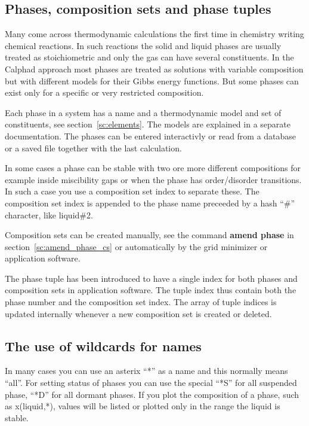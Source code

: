 \documentclass[11pt]{article}
\begin{document}
\hypertarget{Info phases}{}
\subsection{Phases, composition sets and phase tuples}\label{sc:phases}

Many come across thermodynamic calculations the first time in
chemistry writing chemical reactions.  In such reactions the solid and
liquid phases are usually treated as stoichiometric and only the gas
can have several constituents.  In the Calphad approach most phases
are treated as solutions with variable composition but with different
models for their Gibbs energy functions.  But some phases can exist
only for a specific or very restricted composition.

\hypertarget{Info compset}{}

Each phase in a system has a name and a thermodynamic model and set of
constituents, see section~\ref{sc:elements}.  The models are explained
in a separate documentation.  The phases can be entered interactivly
or read from a database or a saved file together with the last
calculation.

In some cases a phase can be stable with two ore more different
compositions for example inside miscibility gaps or when the phase has
order/disorder transitions.  In such a case you use a composition set
index to separate these.  The composition set index is appended to the
phase name preceeded by a hash ``\#'' character, like liquid\#2.

Composition sets can be created manually, see the command {\bf amend
  phase} in section~\ref{sc:amend_phase_cs} or automatically by the
grid minimizer or application software.

The phase tuple has been introduced to have a single index for both
phases and composition sets in application software.  The tuple index
thus contain both the phase number and the composition set index.  The
array of tuple indices is updated internally whenever a new
composition set is created or deleted.

\subsection{The use of wildcards for names}

In many cases you can use an asterix ``*'' as a name and this normally
means ``all''.  For setting status of phases you can use the special
``*S'' for all suspended phase, ``*D'' for all dormant phases.  If you
plot the composition of a phase, such as x(liquid,*), values will be
listed or plotted only in the range the liquid is stable.
\end{document}
